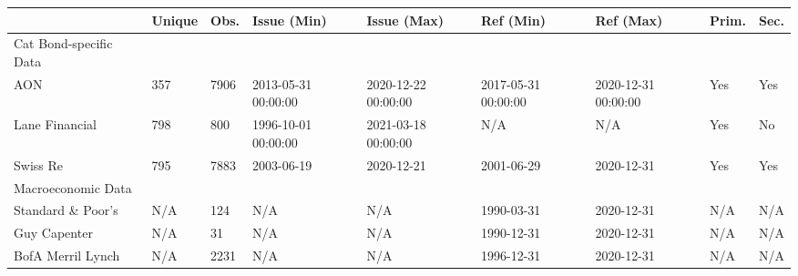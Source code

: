 \begin{tabular}{lllllllll}
\toprule
{} & Unique &  Obs. &          Issue (Min) &          Issue (Max) &            Ref (Min) &            Ref (Max) & Prim. & Sec. \\
\midrule
Cat Bond-specific Data &        &       &                      &                      &                      &                      &       &      \\
  AON                  &    357 &  7906 &  2013-05-31 00:00:00 &  2020-12-22 00:00:00 &  2017-05-31 00:00:00 &  2020-12-31 00:00:00 &   Yes &  Yes \\
  Lane Financial       &    798 &   800 &  1996-10-01 00:00:00 &  2021-03-18 00:00:00 &                  N/A &                  N/A &   Yes &   No \\
  Swiss Re             &    795 &  7883 &           2003-06-19 &           2020-12-21 &           2001-06-29 &           2020-12-31 &   Yes &  Yes \\
Macroeconomic Data     &        &       &                      &                      &                      &                      &       &      \\
  Standard \& Poor's    &    N/A &   124 &                  N/A &                  N/A &           1990-03-31 &           2020-12-31 &   N/A &  N/A \\
  Guy Capenter         &    N/A &    31 &                  N/A &                  N/A &           1990-12-31 &           2020-12-31 &   N/A &  N/A \\
  BofA Merril Lynch    &    N/A &  2231 &                  N/A &                  N/A &           1996-12-31 &           2020-12-31 &   N/A &  N/A \\
\bottomrule
\end{tabular}
